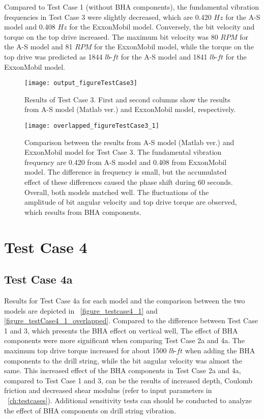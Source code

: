 Compared to Test Case 1 (without BHA components), the fundamental vibration frequencies in Test Case 3 were slightly decreased, which are 0.420 $Hz$ for the A-S model and 0.408 $Hz$ for the ExxonMobil model. Conversely, the bit velocity and torque on the top drive increased. The maximum bit velocity was 80 $RPM$ for the A-S model and 81 $RPM$ for the ExxonMobil model, while the torque on the top drive was predicted as 1844 $lb\mbox{-}ft$ for the A-S model and 1841 $lb\mbox{-}ft$ for the ExxonMobil model. 

\begin{figure}
  \centering
  \texttt{[image: output\_figureTestCase3]}
  \caption[Results of Test Case 3]{Results of Test Case 3. First and second columns show the results from A-S model (Matlab ver.) and ExxonMobil model, respectively.}\label{figure_testcase3}
\end{figure}
\begin{figure}
  \centering
  \texttt{[image: overlapped\_figureTestCase3\_1]}
  \caption[Comparison of the results for Test Case 3]{Comparison between the results from A-S model (Matlab ver.) and ExxonMobil model for Test Case 3. The fundamental vibration frequency are 0.420 from A-S model and 0.408 from ExxonMobil model. The difference in frequency is small, but the accumulated effect of these differences caused the phase shift during 60 seconds. Overall, both models matched well. The fluctuations of the amplitude of bit angular velocity and top drive torque are observed, which results from BHA components.}\label{figure_testcase3_overlapped}
\end{figure}

\section{Test Case 4}

\subsection{Test Case 4a}
Results for Test Case 4a for each model and the comparison between the two models are depicted in \figurename~\ref{figure_testcase4_1} and \ref{figure_testCase4_1_overlapped}. Compared to the difference between Test Case 1 and 3, which presents the BHA effect on vertical well, The effect of BHA components were more significant when comparing Test Case 2a and 4a. The maximum top drive torque increased for about 1500 $lb\mbox{-}ft$ when adding the BHA components to the drill string, while the bit angular velocity was almost the same. This increased effect of the BHA components in Test Case 2a and 4a, compared to Test Case 1 and 3, can be the results of increased depth, Coulomb friction and decreased shear modulus (refer to input parameters in \chaptername~\ref{ch:testcases}). Additional sensitivity tests can should be conducted to analyze the effect of BHA components on drill string vibration.

